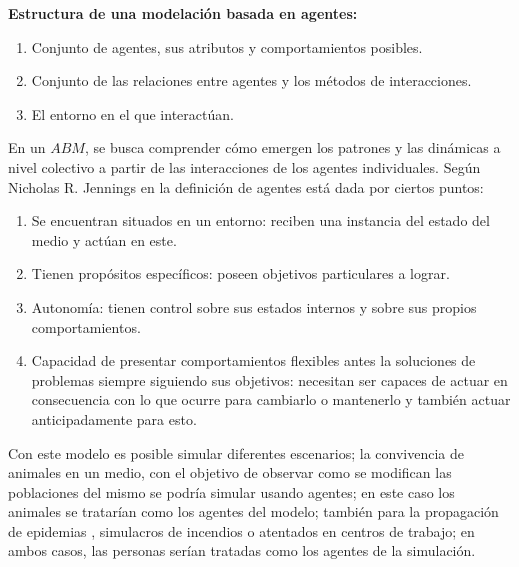\textbf{Estructura de una modelación basada en agentes:}\\
\begin{enumerate}
    \item Conjunto de agentes, sus atributos y comportamientos posibles.
    \item Conjunto de las relaciones entre agentes y los métodos de interacciones.
    \item El entorno en el que interactúan.
\end{enumerate}


En un $ABM$, se busca comprender cómo emergen los patrones y las dinámicas a nivel colectivo a partir de las interacciones 
de los agentes individuales. Según Nicholas R. Jennings en \autocite{Jennings2000} la definición de agentes está dada 
por ciertos puntos:\\
\begin{enumerate}
    \item Se encuentran situados en un entorno: reciben una instancia del estado del medio y actúan en este.
    \item Tienen propósitos específicos: poseen objetivos particulares a lograr.
    \item Autonomía: tienen control sobre sus estados internos y sobre sus propios comportamientos.
    \item Capacidad de presentar comportamientos flexibles antes la soluciones de problemas siempre siguiendo sus objetivos: necesitan ser capaces de actuar en consecuencia con lo que ocurre para cambiarlo o mantenerlo y también actuar anticipadamente para esto.
\end{enumerate}

Con este modelo es posible simular diferentes escenarios; la convivencia de animales en un medio, con el 
objetivo de observar como se modifican las poblaciones del mismo se podría simular usando agentes; en este 
caso los animales se tratarían como los agentes del modelo; también para la propagación de epidemias \autocite{Bagni2002}, 
simulacros de incendios o atentados en centros de trabajo; en ambos casos, las personas serían tratadas como los agentes 
de la simulación.


